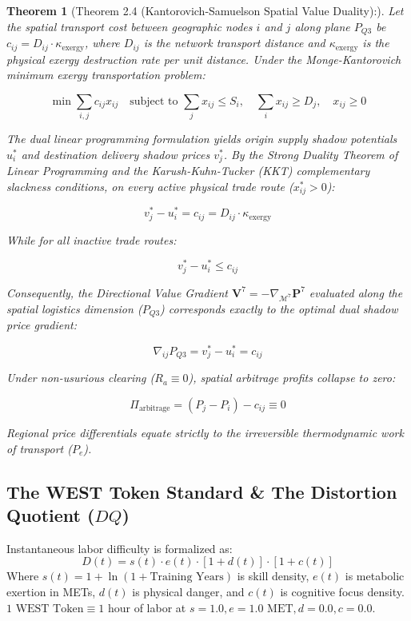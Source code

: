 \documentclass[preprint,12pt,authoryear]{elsarticle}
\newtheorem{theorem}{Theorem}
\theoremstyle{definition}
\begin{document}
\begin{theorem}[Theorem 2.4 (Kantorovich-Samuelson Spatial Value Duality):] Let the spatial transport cost between geographic nodes $i$ and $j$ along plane $P_{Q3}$ be $c_{ij} = D_{ij} \cdot \kappa_{\text{exergy}}$, where $D_{ij}$ is the network transport distance and $\kappa_{\text{exergy}}$ is the physical exergy destruction rate per unit distance. Under the Monge-Kantorovich minimum exergy transportation problem:

$$\min \sum_{i,j} c_{ij} x_{ij} \quad \text{subject to } \sum_j x_{ij} \le S_i, \quad \sum_i x_{ij} \ge D_j, \quad x_{ij} \ge 0$$

The dual linear programming formulation yields origin supply shadow potentials $u_i^*$ and destination delivery shadow prices $v_j^*$. By the Strong Duality Theorem of Linear Programming and the Karush-Kuhn-Tucker (KKT) complementary slackness conditions, on every active physical trade route ($x_{ij}^* > 0$):

$$v_j^* - u_i^* = c_{ij} = D_{ij} \cdot \kappa_{\text{exergy}}$$

While for all inactive trade routes:

$$v_j^* - u_i^* \le c_{ij}$$

Consequently, the Directional Value Gradient $\mathbf{V}^7 = -\nabla_{\mathcal{M}^7} \mathbf{P}^7$ evaluated along the spatial logistics dimension ($P_{Q3}$) corresponds exactly to the optimal dual shadow price gradient:

$$\nabla_{ij} P_{Q3} = v_j^* - u_i^* = c_{ij}$$

Under non-usurious clearing ($R_a \equiv 0$), spatial arbitrage profits collapse to zero:

$$\Pi_{\text{arbitrage}} = (P_j - P_i) - c_{ij} \equiv 0$$

Regional price differentials equate strictly to the irreversible thermodynamic work of transport ($P_e$).
\end{theorem}

\subsection{The WEST Token Standard \& The Distortion Quotient ($DQ$)}

Instantaneous labor difficulty is formalized as:  
$$D(t) = s(t) \cdot e(t) \cdot [1 + d(t)] \cdot [1 + c(t)]$$  
Where $s(t) = 1 + \ln(1 + \text{Training Years})$ is skill density, $e(t)$ is metabolic exertion in METs, $d(t)$ is physical danger, and $c(t)$ is cognitive focus density. $1\text{ WEST Token} \equiv 1\text{ hour}$ of labor at $s=1.0, e=1.0\text{ MET}, d=0.0, c=0.0$.
\end{document}
